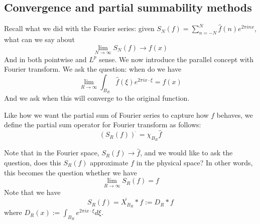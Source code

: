 \subsection{Convergence and partial summability methods}
Recall what we did with the Fourier series: given $S_N(f)=\sum_{n=-N}^N\hat{f}(n)e^{2\pi inx}$, what can we say about 
\begin{equation*}
    \lim_{N\to\infty}S_N(f)\to f(x)
\end{equation*}
And in both pointwise and $L^p$ sense. We now introduce the parallel concept with Fourier transform. We ask the question: when do we have
\begin{equation*}
    \lim_{R\to\infty}\int_{B_R}\hat{f}(\xi)e^{2\pi ix\cdot\xi}=f(x)
\end{equation*}
And we ask when this will converge to the original function.
\begin{definition}
    Like how we want the partial sum of Fourier series to capture how $f$ behaves, we define the partial sum operator for Fourier transform as follows:
    \begin{equation*}
        (S_R(f))^{\widehat{\phantom{.}}}=\chi_{B_R}\hat{f}
    \end{equation*}
\end{definition}
Note that in the Fourier space, $S_R(f)\to\hat{f}$, and we would like to ask the question, does this $S_R(f)$ approximate $f$ in the physical space? In other words, this becomes the question whether we have
\begin{equation*}
    \lim_{R\to\infty}S_R(f)=f
\end{equation*}
Note that we have
\begin{equation*}
    S_R(f)=\check{X_{B_R}}\ast f:=D_R\ast f
\end{equation*}
where $D_R(x):=\int_{B_R}e^{2\pi ix\cdot\xi}d\xi$.

